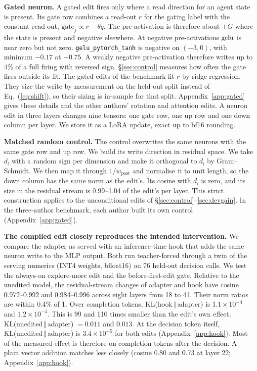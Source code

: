 \textbf{Gated neuron.} A gated edit fires only where a read direction for an agent state is present. Its gate row combines a read-out $r$ for the gating label with the constant read-out, $\mathrm{gate}_j \propto r - \theta q$. The pre-activation is therefore about $+G$ where the state is present and negative elsewhere. At negative pre-activations $\mathrm{gelu}$ is near zero but not zero. \texttt{gelu\_pytorch\_tanh} is negative on $(-3, 0)$, with minimum $-0.17$ at $-0.75$. A weakly negative pre-activation therefore writes up to 4\% of a full firing with reversed sign. \S\ref{sec:control} measures how often the gate fires outside its fit. The gated edits of the benchmark fit $r$ by ridge regression. They size the write by measurement on the held-out split instead of Eq.~(\ref{eq:shift}), so their sizing is in-sample for that split. Appendix~\ref{app:gated} gives these details and the other authors' rotation and attention edits. A neuron edit in three layers changes nine tensors: one gate row, one up row and one down column per layer. We store it as a LoRA update, exact up to bf16 rounding.

\textbf{Matched random control.} The control overwrites the same neurons with the same gate row and up row. We build its write direction in residual space. We take $d_l$ with a random sign per dimension and make it orthogonal to $d_l$ by Gram--Schmidt. We then map it through $1 / w_{\mathrm{post}}$ and normalise it to unit length, so the down column has the same norm as the edit's. Its cosine with $d_l$ is zero, and its size in the residual stream is 0.99--1.04 of the edit's per layer. This strict construction applies to the unconditional edits of \S\ref{sec:control}--\ref{sec:devgain}. In the three-author benchmark, each author built its own control (Appendix~\ref{app:gated}).

\textbf{The compiled edit closely reproduces the intended intervention.} We compare the adapter as served with an inference-time hook that adds the same neuron write to the MLP output. Both run teacher-forced through a twin of the serving numerics (INT4 weights, bfloat16) on 76 held-out decision calls. We test the always-on explore-more edit and the before-first-edit gate. Relative to the unedited model, the residual-stream changes of adapter and hook have cosine 0.972--0.992 and 0.984--0.996 across eight layers from 18 to 41. Their norm ratios are within 0.4\% of 1. Over completion tokens, KL(hook$\,\Vert\,$adapter) is $1.1\times10^{-4}$ and $1.2\times10^{-4}$. This is 99 and 110 times smaller than the edit's own effect, KL(unedited$\,\Vert\,$adapter) $= 0.011$ and $0.013$. At the decision token itself, KL(unedited$\,\Vert\,$adapter) is $3.4\times10^{-5}$ for both edits (Appendix~\ref{app:hook}). Most of the measured effect is therefore on completion tokens after the decision. A plain vector addition matches less closely (cosine 0.80 and 0.73 at layer 22; Appendix~\ref{app:hook}).

